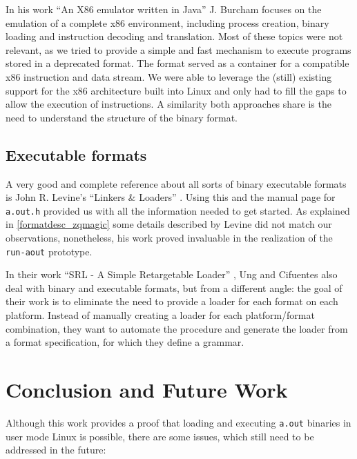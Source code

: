 \documentclass[draft,final]{vutinfth} %
\begin{document}
In his work ``An X86 emulator written in Java'' \cite{JBurcham} J. Burcham focuses on the emulation of a complete x86 environment, including process creation, binary loading and instruction decoding and translation. Most of these topics were not relevant, as we tried to provide a simple and fast mechanism to execute programs stored in a deprecated format. The format served as a container for a compatible x86 instruction and data stream. We were able to leverage the (still) existing support for the x86 architecture built into Linux and only had to fill the gaps to allow the execution of instructions. A similarity both approaches share is the need to understand the structure of the binary format.

\section{Executable formats}

A very good and complete reference about all sorts of binary executable formats is John R. Levine's ``Linkers \& Loaders'' \cite{Levine}. Using this and the manual page for \texttt{a.out.h}\cite{FreeBSDAoutManPage} provided us with all the information needed to get started. As explained in \ref{formatdesc_zqmagic} some details described by Levine did not match our observations, nonetheless, his work proved invaluable in the realization of the \texttt{run-aout} prototype.

In their work ``SRL - A Simple Retargetable Loader'' \cite{DBLP:conf/aswec/UngC97}, Ung and Cifuentes also deal with binary and executable formats, but from a different angle: the goal of their work is to eliminate the need to provide a loader for each format on each platform. Instead of manually creating a loader for each platform/format combination, they want to automate the procedure and generate the loader from a format specification, for which they define a grammar.

\chapter{Conclusion and Future Work}

Although this work provides a proof that loading and executing \texttt{a.out} binaries in user mode Linux is possible, there are some issues, which still need to be addressed in the future:
\end{document}

